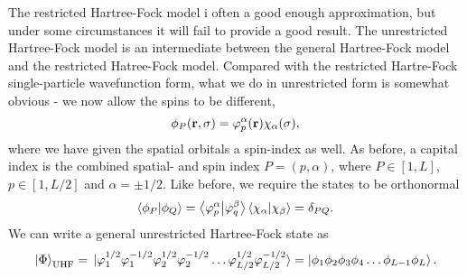 The restricted Hartree-Fock model i often a good enough approximation, but under some 
circumstances it will fail to provide a good result. The unrestricted Hartree-Fock model 
is an intermediate between the general Hartree-Fock model and the restricted Hatree-Fock 
model. Compared with the restricted Hartre-Fock single-particle wavefunction form, what we do 
in unrestricted form is somewhat obvious - we now allow the spins to be different,
\begin{equation}
    \phi_P(\vb{r}, \sigma) = \varphi_p^{\alpha}(\vb{r})\chi_\alpha(\sigma),
\end{equation}
where we have given the spatial orbitals a spin-index as well. As before, a capital index 
is the combined spatial- and spin index $P=(p,\alpha)$, where $P \in [1,L]$, $p\in [1, L/2]$
and $\alpha = \pm 1/2$. 
Like before, we require the states to be orthonormal 
\begin{equation}
    \braket{\phi_P}{\phi_Q} 
    = \braket{\varphi^\alpha_p}{\varphi^\beta_q}\braket{\chi_\alpha}{\chi_\beta}
    = \delta_{PQ}.
\end{equation}
We can write a general unrestricted Hartree-Fock state as 
\begin{equation}
    \ket{\Phi}_{\text{UHF}}
        =
        \ket*{\varphi_1^{1/2} \varphi_1^{-1/2} \varphi_2^{1/2} \varphi_2^{-1/2}
            \dots \varphi_{L/2}^{1/2} \varphi_{L/2}^{-1/2}}
        =
        \ket{\phi_1\phi_2\phi_3\phi_4 \dots \phi_{L-1} \phi_L}.
\end{equation}

